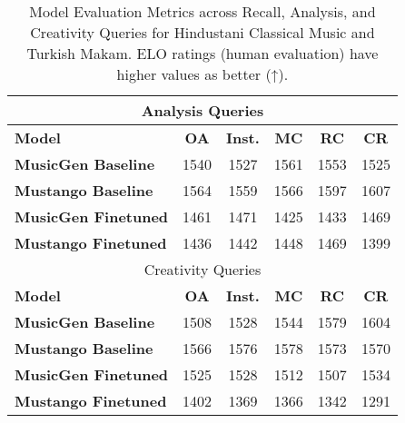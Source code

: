 \begin{table*}
{\begin{tabular}{lccccc}
\multicolumn{6}{c}{Analysis Queries} \\ \midrule
\textbf{Model} & \textbf{OA} & \textbf{Inst.} & \textbf{MC} & \textbf{RC} & \textbf{CR} \\ \midrule
\textbf{MusicGen Baseline} & 1540 & 1527 & 1561 & 1553 & 1525 \\
\textbf{Mustango Baseline} & 1564 & 1559 & 1566 & 1597 & 1607 \\
\textbf{MusicGen Finetuned} & 1461 & 1471 & 1425 & 1433 & 1469 \\
\textbf{Mustango Finetuned} & 1436 & 1442 & 1448 & 1469 & 1399 \\ \midrule

\multicolumn{6}{c}{Creativity Queries} \\ \midrule
\textbf{Model} & \textbf{OA} & \textbf{Inst.} & \textbf{MC} & \textbf{RC} & \textbf{CR} \\ \midrule
\textbf{MusicGen Baseline} & 1508 & 1528 & 1544 & 1579 & 1604 \\
\textbf{Mustango Baseline} & 1566 & 1576 & 1578 & 1573 & 1570 \\
\textbf{MusicGen Finetuned} & 1525 & 1528 & 1512 & 1507 & 1534 \\
\textbf{Mustango Finetuned} & 1402 & 1369 & 1366 & 1342 & 1291 \\
\bottomrule
\end{tabular}}
\caption{Model Evaluation Metrics across Recall, Analysis, and Creativity Queries for Hindustani Classical Music and Turkish Makam. ELO ratings (human evaluation) have higher values as better (↑).}
\label{tab:overall_model_metrics_query}
\end{table*}